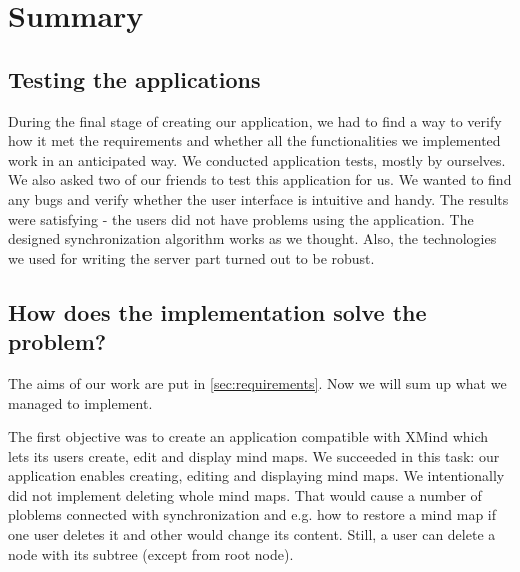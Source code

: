 %
%
%
%
%

\chapter{Summary}
\label{chap:summary}

\section{Testing the applications}
\label{sec:summary-testing}
During the final stage of creating our application, we had to find a way to verify how it met the requirements and whether all the functionalities we implemented work in an anticipated way. We conducted application tests, mostly by ourselves. We also asked two of our friends to test this application for us. We wanted to find any bugs and verify whether the user interface is intuitive and handy. The results were satisfying - the users did not have problems using the application. The designed synchronization algorithm works as we thought. Also, the technologies we used for writing the server part turned out to be robust.

\section{How does the implementation solve the problem?}
\label{sec:summary-how-solve}
The aims of our work are put in \cref{sec:requirements}. Now we will sum up what we managed to implement. 
 
The first objective was to create an application compatible with XMind which lets its users create, edit and display mind maps. We succeeded in this task: our application enables creating, editing and displaying mind maps. 
We intentionally did not implement deleting whole mind maps. That would cause a number of ploblems connected with synchronization and e.g. how to restore a mind map if one user deletes it and other would change its content. Still, a user can delete a node with its subtree (except from root node).

